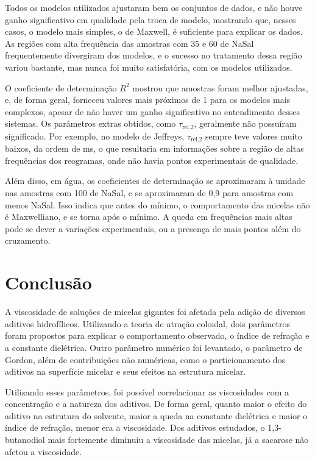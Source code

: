 		Todos os modelos utilizados ajustaram bem os conjuntos de dados, e não houve ganho significativo em qualidade pela troca de modelo, mostrando que, nesses casos, o modelo mais simples, o de Maxwell, é suficiente para explicar os dados. As regiões com alta frequência das amostras com 35 e 60 \mM{} de NaSal frequentemente divergiram dos modelos, e o sucesso no tratamento dessa região variou bastante, mas nunca foi muito satisfatória, com os modelos utilizados.
		
		O coeficiente de determinação \(R^2\) mostrou que amostras foram melhor ajustadas, e, de forma geral, forneceu valores mais próximos de 1 para os modelos mais complexos, apesar de não haver um ganho significativo no entendimento desses sistemas. Os parâmetros extras obtidos, como \(\tau_{\textrm{rel,2}}\), geralmente não possuíram significado. Por exemplo, no modelo de Jeffreys, \(\tau_{\textrm{rel,2}}\) sempre teve valores muito baixos, da ordem de ms, o que resultaria em informações sobre a região de altas frequências dos reogramas, onde não havia pontos experimentais de qualidade.
		
		Além disso, em água, os coeficientes de determinação se aproximaram à unidade nas amostras com 100 \mM{} de NaSal, e se aproximaram de 0,9 para amostras com menos NaSal. Isso indica que antes do mínimo, o comportamento das micelas não é Maxwelliano, e se torna após o mínimo. A queda em frequências mais altas pode se dever a variações experimentais, ou a presença de mais pontos além do cruzamento.

	\chapter{Conclusão} 
	
		A viscosidade de soluções de micelas gigantes foi afetada pela adição de diversos aditivos hidrofílicos. Utilizando a teoria de atração coloidal,  dois parâmetros foram propostos para explicar o comportamento observado, o índice de refração e a constante dielétrica. Outro parâmetro numérico foi levantado, o parâmetro de Gordon, além de contribuições não numéricas, como o particionamento dos aditivos na superfície micelar e seus efeitos na estrutura micelar.
		
		Utilizando esses parâmetros, foi possível correlacionar as viscosidades com a concentração e a natureza dos aditivos. De forma geral, quanto maior o efeito do aditivo na estrutura do solvente, maior a queda na constante dielétrica e maior o índice de refração, menor era a viscosidade. Dos aditivos estudados, o 1,3-butanodiol mais fortemente diminuiu a viscosidade das micelas, já a sacarose não afetou a viscosidade.
		
